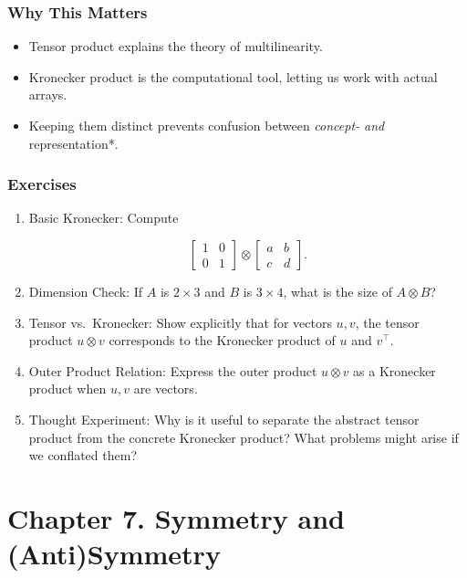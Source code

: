 \documentclass[
  letterpaper,
  DIV=11,
  numbers=noendperiod]{scrreprt}
\providecommand{\tightlist}{%
  \setlength{\itemsep}{0pt}\setlength{\parskip}{0pt}}
\begin{document}
\subsubsection{Why This Matters}\label{why-this-matters-12}

\begin{itemize}
\tightlist
\item
  Tensor product explains the theory of multilinearity.
\item
  Kronecker product is the computational tool, letting us work with
  actual arrays.
\item
  Keeping them distinct prevents confusion between \emph{concept- and
  }representation*.
\end{itemize}

\subsubsection{Exercises}\label{exercises-23}

\begin{enumerate}
\def\labelenumi{\arabic{enumi}.}
\item
  Basic Kronecker: Compute

  \[
  \begin{bmatrix}1 & 0 \\ 0 & 1\end{bmatrix} \otimes
  \begin{bmatrix}a & b \\ c & d\end{bmatrix}.
  \]
\item
  Dimension Check: If \(A\) is \(2 \times 3\) and \(B\) is
  \(3 \times 4\), what is the size of \(A \otimes B\)?
\item
  Tensor vs.~Kronecker: Show explicitly that for vectors \(u,v\), the
  tensor product \(u \otimes v\) corresponds to the Kronecker product of
  \(u\) and \(v^\top\).
\item
  Outer Product Relation: Express the outer product \(u \otimes v\) as a
  Kronecker product when \(u,v\) are vectors.
\item
  Thought Experiment: Why is it useful to separate the abstract tensor
  product from the concrete Kronecker product? What problems might arise
  if we conflated them?
\end{enumerate}

\section{Chapter 7. Symmetry and
(Anti)Symmetry}\label{chapter-7.-symmetry-and-antisymmetry}
\end{document}
